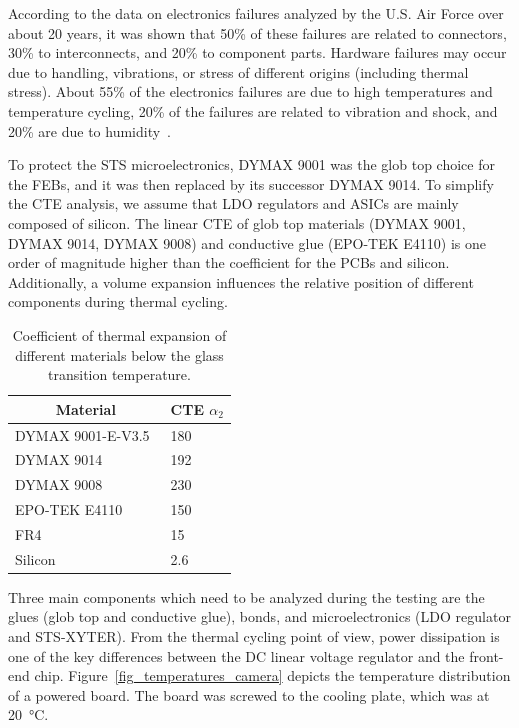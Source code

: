 According to the data on electronics failures analyzed by the U.S. Air Force over about 20 years, it was shown that 50\% of these failures are related to connectors, 30\% to interconnects, and 20\% to component
parts. Hardware failures may occur due to handling, vibrations, or stress of different origins (including thermal stress). About 55\% of the electronics failures are due to high temperatures and temperature cycling, 20\% of the failures are related to vibration and shock, and 20\% are due to humidity~\cite{thermal_electronics}. 

To protect the STS microelectronics, DYMAX 9001 was the glob top choice for the \glspl{FEB}, and it was then replaced by its successor DYMAX 9014. To simplify the CTE analysis, we assume that \gls{LDO} regulators and \glspl{ASIC} are mainly composed of silicon. The linear CTE of glob top materials (DYMAX 9001, DYMAX 9014, DYMAX 9008) and conductive glue (EPO-TEK E4110) is one order of magnitude higher than the coefficient for the \glspl{PCB} and silicon. Additionally, a volume expansion influences the relative position of different components during thermal cycling.

\begin{table}[!h]
\begin{center}
\caption{Coefficient of thermal expansion of different materials below the glass transition temperature.}
\begin{tabular}{ll}
\hline
\multicolumn{1}{c}{Material} & \multicolumn{1}{c}{CTE $\alpha_{2}$} [\si{\micro\metre\per\metre\per\celsius]}] \\ \hline
DYMAX 9001-E-V3.5~\cite{9001}            & 180                                  \\
DYMAX 9014~\cite{9014}                   & 192                                  \\
DYMAX 9008~\cite{9008}                   & 230                                  \\
EPO-TEK E4110~\cite{4110}                & 150                                  \\ \hline
FR4~\cite{FR4}                          & 15                                   \\
Silicon~\cite{Si}                           & 2.6                                 
\end{tabular}
\label{TCE}
\end{center}
\end{table}
 \newpage
Three main components which need to be analyzed during the testing are the glues (glob top and conductive glue), bonds, and microelectronics (LDO regulator and STS-XYTER). From the thermal cycling point of view, power dissipation is one of the key differences between the DC linear voltage regulator and the front-end chip. Figure~\ref{fig_temperatures_camera} depicts the temperature distribution of a powered board. The board was screwed to the cooling plate, which was at \SI{20}{\celsius}.

